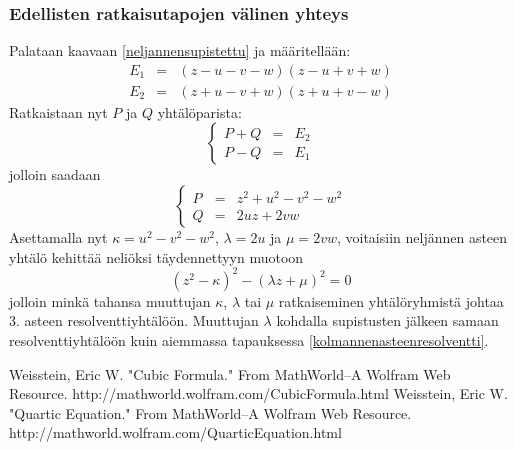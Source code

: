 \documentclass[a4paper]{article}
\begin{document}
\subsubsection{Edellisten ratkaisutapojen välinen yhteys}
Palataan kaavaan \ref{neljannensupistettu} ja määritellään:
\begin{eqnarray*}
  E_1 & = & (z-u-v-w)(z-u+v+w) \\
  E_2 & = & (z+u-v+w)(z+u+v-w)
\end{eqnarray*}
Ratkaistaan nyt $P$ ja $Q$ yhtälöparista:
$$
  \left\{
  \begin{array}{ccc}
    P+Q & = & E_2 \\
    P-Q & = & E_1
  \end{array}
  \right.
$$
jolloin saadaan
$$
  \left\{
  \begin{array}{ccc}
    P & = & z^2+u^2-v^2-w^2 \\
    Q & = & 2uz+2vw
  \end{array}
  \right.
$$
Asettamalla nyt $\kappa=u^2-v^2-w^2$, $\lambda=2u$ ja $\mu=2vw$, voitaisiin neljännen asteen yhtälö kehittää neliöksi täydennettyyn muotoon
$$
\left(z^2-\kappa\right)^2-\left(\lambda z+\mu\right)^2=0
$$
jolloin minkä tahansa muuttujan $\kappa$, $\lambda$ tai $\mu$ ratkaiseminen yhtälöryhmistä johtaa 3. asteen resolventtiyhtälöön. Muuttujan $\lambda$ kohdalla supistusten jälkeen samaan resolventtiyhtälöön kuin aiemmassa tapauksessa \ref{kolmannenasteenresolventti}.
\begin{thebibliography}{99}
 Weisstein, Eric W. "Cubic Formula." From MathWorld--A Wolfram Web Resource. http://mathworld.wolfram.com/CubicFormula.html
 Weisstein, Eric W. "Quartic Equation." From MathWorld--A Wolfram Web Resource. http://mathworld.wolfram.com/QuarticEquation.html
\end{thebibliography}
\end{document}
